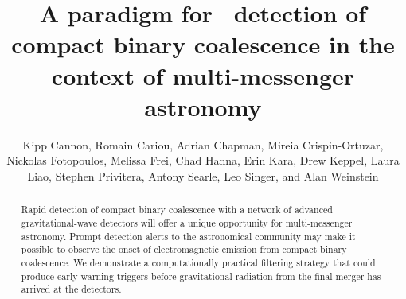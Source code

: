 \documentclass[preprint2]{aastex}
\begin{document}
\title{A paradigm for \earlywarning\ detection of compact binary coalescence
in the context of multi-messenger astronomy}


\author{
	Kipp Cannon,
	Romain Cariou,
	Adrian Chapman,
	Mireia Crispin-Ortuzar,
	Nickolas Fotopoulos,
	Melissa Frei,
	Chad Hanna,
	Erin Kara,
	Drew Keppel,
	Laura Liao,
	Stephen Privitera,
	Antony Searle,
	Leo Singer, and
	Alan Weinstein
}



\begin{abstract}
Rapid detection of compact binary coalescence with a network of advanced
gravitational-wave detectors will offer a unique opportunity for
multi-messenger astronomy.  Prompt detection alerts to the astronomical
community may make it possible to observe the onset of electromagnetic emission
from compact binary coalescence.  We demonstrate a computationally practical
filtering strategy that could produce early-warning triggers before
gravitational radiation from the final merger has arrived at the detectors.
\end{abstract}






\end{document}
